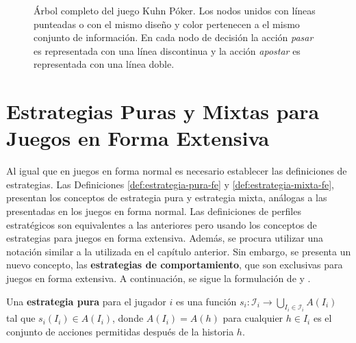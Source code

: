 \begin{figure}[h]
\begin{center}
\end{center}
\caption{Árbol completo del juego Kuhn Póker. Los nodos unidos con líneas punteadas o con el mismo diseño y color pertenecen a el mismo conjunto de información. En cada nodo de decisión la acción \textit{pasar} es representada con una línea discontinua y la acción \textit{apostar} es representada con una línea doble.}
\label{fig:kuhn-poker}
\end{figure}

\section{Estrategias Puras y Mixtas para Juegos en Forma Extensiva}

Al igual que en juegos en forma normal es necesario establecer las definiciones de estrategias. Las Definiciones \ref{def:estrategia-pura-fe} y \ref{def:estrategia-mixta-fe}, presentan los conceptos de estrategia pura y estrategia mixta, análogas a las presentadas en los juegos en forma normal. Las definiciones de perfiles estratégicos son equivalentes a las anteriores pero usando los conceptos de estrategias para juegos en forma extensiva. Además, se procura utilizar una notación similar a la utilizada en el capítulo anterior. Sin embargo, se presenta un nuevo concepto, las \textbf{estrategias de comportamiento}, que son exclusivas para juegos en forma extensiva. A continuación, se sigue la formulación de \cite{bib:course-game-theory} y \cite{bib:conceptos-basicos}.

\begin{definition}
\label{def:estrategia-pura-fe}
Una \textbf{estrategia pura} para el jugador $i$ es una función $s_i : \mathcal{I}_i \rightarrow \bigcup_{I_i \in \mathcal{I}_i}A(I_i)$ tal que $s_i(I_i) \in A(I_i)$, donde $A(I_i) = A(h)$ para cualquier $h \in I_i$ es el conjunto de acciones permitidas después de la historia $h$. 
\end{definition}

